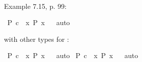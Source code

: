 \begin{isabellebody}
\isadelimproof
\ %
\endisadelimproof
%
\isatagproof
{}\isamarkupfalse%
\ %
%
\endisatagproof
{\isafoldproof}%
%
\isadelimproof
%
\endisadelimproof
%
\begin{isamarkuptext}%
Example 7.15, p. 99:%
\end{isamarkuptext}\isamarkuptrue%
\isamarkupfalse%
\ {\isachardoublequoteopen}{\isasymlfloor}\isactrlbold {\isasymbox}{\isacharparenleft}P\ {\isacharparenleft}c{\isacharcolon}{\isacharcolon}{\isasymup}{\isasymzero}{\isacharparenright}{\isacharparenright}\ \isactrlbold {\isasymrightarrow}\ {\isacharparenleft}\isactrlbold {\isasymexists}x{\isacharcolon}{\isacharcolon}{\isasymup}{\isasymzero}{\isachardot}\ \isactrlbold {\isasymbox}{\isacharparenleft}P\ x{\isacharparenright}{\isacharparenright}{\isasymrfloor}{\isachardoublequoteclose}%
\isadelimproof
\ %
\endisadelimproof
%
\isatagproof
{}\isamarkupfalse%
\ auto%
\endisatagproof
{\isafoldproof}%
%
\isadelimproof
%
\endisadelimproof
%
\begin{isamarkuptext}%
with other types for :%
\end{isamarkuptext}\isamarkuptrue%
\isamarkupfalse%
\ {\isachardoublequoteopen}{\isasymlfloor}\isactrlbold {\isasymbox}{\isacharparenleft}P\ {\isacharparenleft}c{\isacharcolon}{\isacharcolon}{\isasymzero}{\isacharparenright}{\isacharparenright}\ \isactrlbold {\isasymrightarrow}\ {\isacharparenleft}\isactrlbold {\isasymexists}x{\isacharcolon}{\isacharcolon}{\isasymzero}{\isachardot}\ \isactrlbold {\isasymbox}{\isacharparenleft}P\ x{\isacharparenright}{\isacharparenright}{\isasymrfloor}{\isachardoublequoteclose}%
\isadelimproof
\ %
\endisadelimproof
%
\isatagproof
{}\isamarkupfalse%
\ auto%
\endisatagproof
{\isafoldproof}%
%
\isadelimproof
%
\endisadelimproof
\isanewline
{}\isamarkupfalse%
\ {\isachardoublequoteopen}{\isasymlfloor}\isactrlbold {\isasymbox}{\isacharparenleft}P\ {\isacharparenleft}c{\isacharcolon}{\isacharcolon}{\isasymlangle}{\isasymzero}{\isasymrangle}{\isacharparenright}{\isacharparenright}\ \isactrlbold {\isasymrightarrow}\ {\isacharparenleft}\isactrlbold {\isasymexists}x{\isacharcolon}{\isacharcolon}{\isasymlangle}{\isasymzero}{\isasymrangle}{\isachardot}\ \isactrlbold {\isasymbox}{\isacharparenleft}P\ x{\isacharparenright}{\isacharparenright}{\isasymrfloor}{\isachardoublequoteclose}%
\isadelimproof
\ %
\endisadelimproof
%
\isatagproof
{}\isamarkupfalse%
\ auto%
\endisatagproof
{\isafoldproof}%
%
\isadelimproof
%
\endisadelimproof

\end{isabellebody}
